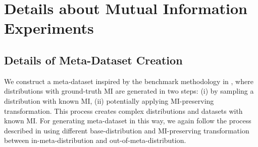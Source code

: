 \begin{table*}[t]
\centering
{}
\caption{Reporting True Positive (TP), False Positive (FP), True Negative (TN), False Negative (FN), the associated Precision, Recall, and F1-Score of normality classifers over 1,000 datasets of size $n=50$.}
\label{tab:prec_rec}
\end{table*}




\section{Details about Mutual Information Experiments}
\label{app:mi_details}

\subsection{Details of Meta-Dataset Creation}
We construct a meta-dataset inspired by the benchmark methodology in \cite{NEURIPS2023_36b80eae}, where distributions with ground-truth MI are generated in two steps: (i) by sampling a distribution with known MI, (ii) potentially applying MI-preserving transformation. This process creates complex distributions and datasets with known MI. For generating meta-dataset in this way, we again follow the process described in  using different base-distribution and MI-preserving transformation between in-meta-distribution and out-of-meta-distribution. 


